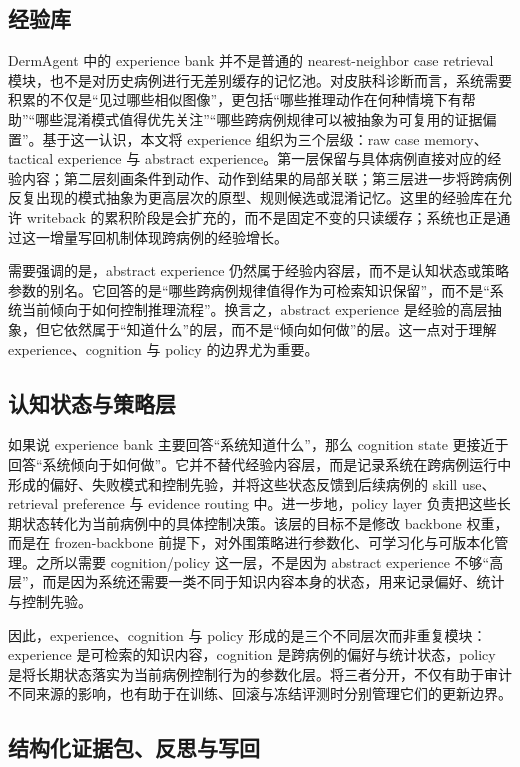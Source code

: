 \documentclass{article}
\begin{document}
\subsection{经验库}

DermAgent 中的 experience bank 并不是普通的 nearest-neighbor case retrieval 模块，也不是对历史病例进行无差别缓存的记忆池。对皮肤科诊断而言，系统需要积累的不仅是“见过哪些相似图像”，更包括“哪些推理动作在何种情境下有帮助”“哪些混淆模式值得优先关注”“哪些跨病例规律可以被抽象为可复用的证据偏置”。基于这一认识，本文将 experience 组织为三个层级：raw case memory、tactical experience 与 abstract experience。第一层保留与具体病例直接对应的经验内容；第二层刻画条件到动作、动作到结果的局部关联；第三层进一步将跨病例反复出现的模式抽象为更高层次的原型、规则候选或混淆记忆。这里的经验库在允许 writeback 的累积阶段是会扩充的，而不是固定不变的只读缓存；系统也正是通过这一增量写回机制体现跨病例的经验增长。

需要强调的是，abstract experience 仍然属于经验内容层，而不是认知状态或策略参数的别名。它回答的是“哪些跨病例规律值得作为可检索知识保留”，而不是“系统当前倾向于如何控制推理流程”。换言之，abstract experience 是经验的高层抽象，但它依然属于“知道什么”的层，而不是“倾向如何做”的层。这一点对于理解 experience、cognition 与 policy 的边界尤为重要。

\subsection{认知状态与策略层}

如果说 experience bank 主要回答“系统知道什么”，那么 cognition state 更接近于回答“系统倾向于如何做”。它并不替代经验内容层，而是记录系统在跨病例运行中形成的偏好、失败模式和控制先验，并将这些状态反馈到后续病例的 skill use、retrieval preference 与 evidence routing 中。进一步地，policy layer 负责把这些长期状态转化为当前病例中的具体控制决策。该层的目标不是修改 backbone 权重，而是在 frozen-backbone 前提下，对外围策略进行参数化、可学习化与可版本化管理。之所以需要 cognition/policy 这一层，不是因为 abstract experience 不够“高层”，而是因为系统还需要一类不同于知识内容本身的状态，用来记录偏好、统计与控制先验。

因此，experience、cognition 与 policy 形成的是三个不同层次而非重复模块：experience 是可检索的知识内容，cognition 是跨病例的偏好与统计状态，policy 是将长期状态落实为当前病例控制行为的参数化层。将三者分开，不仅有助于审计不同来源的影响，也有助于在训练、回滚与冻结评测时分别管理它们的更新边界。

\subsection{结构化证据包、反思与写回}
\end{document}
